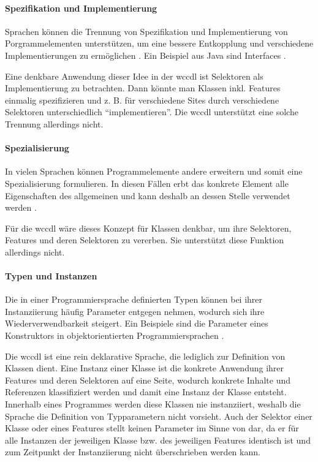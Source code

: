     \paragraph{Spezifikation und Implementierung}
    Sprachen können die Trennung von Spezifikation und Implementierung von
    Porgrammelementen unterstützen, um eine bessere Entkopplung und verschiedene
    Implementierungen zu ermöglichen \cite[Kapitel 5.1.3]{voelter:DslEngineering}.
    Ein Beispiel aus Java sind Interfaces \cite[Kapitel 9]{oracle:javaSpec}.

    Eine denkbare Anwendung dieser Idee in der \gls{wccdl} ist Selektoren als
    Implementierung zu betrachten. Dann könnte man Klassen inkl. Features einmalig spezifizieren
    und z. B. für verschiedene Sites durch verschiedene Selektoren unterschiedlich "`implementieren"'.
    Die \gls{wccdl} unterstützt eine solche Trennung allerdings nicht.

    \paragraph{Spezialisierung}
    In vielen Sprachen können Programmelemente andere erweitern und somit eine Spezialisierung formulieren.
    In diesen Fällen erbt das konkrete Element alle Eigenschaften des allgemeinen
    und kann deshalb an dessen Stelle verwendet werden
    \cite[Kapitel 5.1.4]{voelter:DslEngineering}.

    Für die \gls{wccdl} wäre dieses Konzept für Klassen denkbar,
    um ihre Selektoren, Features und deren Selektoren zu vererben.
    Sie unterstützt diese Funktion allerdings nicht.

    \paragraph{Typen und Instanzen}
    Die in einer Programmiersprache definierten Typen können bei ihrer Instanziierung
    häufig Parameter entgegen nehmen, wodurch sich ihre Wiederverwendbarkeit steigert.
    Ein Beispiele sind die Parameter eines Konstruktors in objektorientierten Programmiersprachen
    \cite[Kapitel 5.1.5]{voelter:DslEngineering}.

    Die \gls{wccdl} ist eine rein deklarative Sprache,
    die lediglich zur Definition von Klassen dient.
    Eine Instanz einer Klasse ist die konkrete Anwendung ihrer Features und
    deren Selektoren auf eine Seite,
    wodurch konkrete Inhalte und Referenzen klassifiziert werden und damit eine Instanz
    der Klasse entsteht.
    Innerhalb eines Programmes werden diese Klassen nie instanziiert,
    weshalb die Sprache die Definition von Typparametern nicht vorsieht. 
    Auch der Selektor einer Klasse oder eines Features stellt keinen Parameter im
    Sinne von \cite[Kapitel 5.1.5]{voelter:DslEngineering} dar,
    da er für alle Instanzen der jeweiligen Klasse bzw. des jeweiligen Features identisch ist und
    zum Zeitpunkt der Instanziierung nicht
    überschrieben werden kann.

